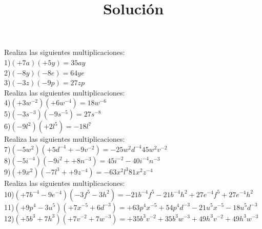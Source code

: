 \documentclass[a4paper,12pt]{article}
\title{Solución}
\author{}
\date{}
\begin{document}
\maketitle
Realiza las siguientes multiplicaciones: \vspace{1cm}\\ 
1)$(+7a)(+5y)=35ay $\vspace{1cm}\\ 
2)$(-8y)(-8e)=64ye $\vspace{1cm}\\ 
3)$(-3z)(-9p)=27zp $\vspace{1cm}\\ 
Realiza las siguientes multiplicaciones: \vspace{1cm}\\ 
4)$(+3w^{-2})(+6w^{-4} )=18w^{-6} $\vspace{1cm}\\ 
5)$(-3s^{-3})(-9s^{-5} )=27s^{-8} $\vspace{1cm}\\ 
6)$(-9l^{2})(+2l^{5} )=-18l^{7} $\vspace{1cm}\\ 
Realiza las siguientes multiplicaciones: \vspace{1cm}\\ 
7)$(-5w^{2})(+5d^{-4}+-9v^{-2} )= -25w^{2}d^{-4}45w^{2}v^{-2}   $\vspace{1cm}\\ 
8)$(-5i^{-4})(-9i^{2}++8n^{-3} )= 45i^{-2}-40i^{-4}n^{-3}   $\vspace{1cm}\\ 
9)$(+9x^{2})(-7l^{3}++9z^{-4} )= -63x^{2}l^{3}81x^{2}z^{-4}   $\vspace{1cm}\\ 
Realiza las siguientes multiplicaciones: \vspace{1cm}\\ 
10)$(+7b^{-4}-9e^{-4} )(-3f^{5}-3h^{2} )= -21b^{-4}f^{5}-21b^{-4}h^{2}+27e^{-4}f^{5}+27e^{-4}h^{2}$\vspace{1cm}\\ 
11)$(+9p^{4}-3u^{5} )(+7x^{-5}+6d^{-3} )= +63p^{4}x^{-5}+54p^{4}d^{-3}-21u^{5}x^{-5}-18u^{5}d^{-3}$\vspace{1cm}\\ 
12)$(+5b^{3}+7h^{3} )(+7v^{-2}+7w^{-3} )= +35b^{3}v^{-2}+35b^{3}w^{-3}+49h^{3}v^{-2}+49h^{3}w^{-3}$\vspace{1cm}\\ 
\end{document}
